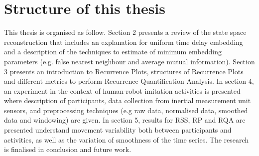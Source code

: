 \section{Structure of this thesis}

This thesis is organised as follow. 
Section 2 presents a review of the state space reconstruction 
that includes an explanation for uniform time delay embedding and a 
description of the techniques to estimate of minimum embedding 
parameters (e.g. false nearest neighbour and average mutual information).
Section 3 presents an introduction to Recurrence Plots,
structures of Recurrence Plots and different metrics to perform Recurrence Quantification Analysis.
In section 4, an experiment in the context of human-robot imitation
activities is presented where description of participants, data collection from inertial measurement unit sensors,
and preprocessing techniques (e.g raw data, normalised data, smoothed data and windowing)
are given.
In section 5, results for RSS, RP and RQA are presented understand 
movement variability both between participants and activities, 
as well as the variation of smoothness of the time series.
The research is finalised in conclusion and future work.



